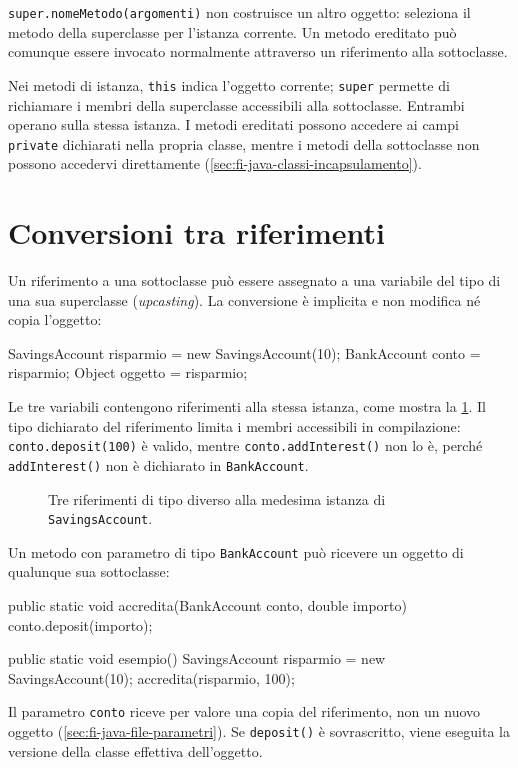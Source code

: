 \texttt{super.nomeMetodo(argomenti)} non costruisce un altro
oggetto: seleziona il metodo della superclasse per l'istanza
corrente. Un metodo ereditato può comunque essere invocato
normalmente attraverso un riferimento alla sottoclasse.

Nei metodi di istanza, \texttt{this} indica l'oggetto corrente;
\texttt{super} permette di richiamare i membri della superclasse
accessibili alla sottoclasse. Entrambi operano sulla stessa
istanza. I metodi ereditati possono accedere ai campi
\texttt{private} dichiarati nella propria classe, mentre i metodi
della sottoclasse non possono accedervi direttamente
(\cref{sec:fi-java-classi-incapsulamento}).

\clearpage

\section{Conversioni tra riferimenti}
\label{sec:fi-java-ereditarieta-conversioni}

Un riferimento a una sottoclasse può essere assegnato a una
variabile del tipo di una sua superclasse (\emph{upcasting}).
La conversione è implicita e non modifica né copia l'oggetto:

\begin{unipdcode}[language=Java]
SavingsAccount risparmio = new SavingsAccount(10);
BankAccount conto = risparmio;
Object oggetto = risparmio;
\end{unipdcode}

Le tre variabili contengono riferimenti alla stessa istanza,
come mostra la \cref{fig:fi-java-ereditarieta-riferimenti}.
Il tipo dichiarato del riferimento limita i membri accessibili
in compilazione: \texttt{conto.deposit(100)} è valido, mentre
\texttt{conto.addInterest()} non lo è, perché
\texttt{addInterest()} non è dichiarato in \texttt{BankAccount}.

\begin{figure}[htbp]
  \centering
  
  \caption{Tre riferimenti di tipo diverso alla medesima
  istanza di \texttt{SavingsAccount}.}
  \label{fig:fi-java-ereditarieta-riferimenti}
\end{figure}

\begin{example}
Un metodo con parametro di tipo \texttt{BankAccount} può
ricevere un oggetto di qualunque sua sottoclasse:

\begin{unipdcode}[language=Java]
public static void accredita(BankAccount conto, double importo) {
    conto.deposit(importo);
}

public static void esempio() {
    SavingsAccount risparmio = new SavingsAccount(10);
    accredita(risparmio, 100);
}
\end{unipdcode}

Il parametro \texttt{conto} riceve per valore una copia del
riferimento, non un nuovo oggetto
(\cref{sec:fi-java-file-parametri}). Se
\texttt{deposit()} è sovrascritto, viene eseguita la versione
della classe effettiva dell'oggetto.
\end{example}

